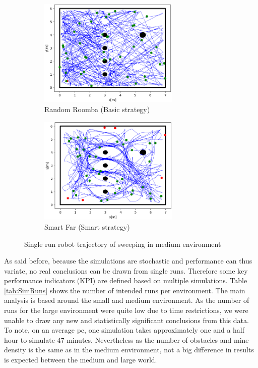 \documentclass[conference]{IEEEtran}
\begin{document}
\begin{figure}[htbp]
     \centering
     \begin{subfigure}[b]{70mm}
         \centering
         \includegraphics[width=67mm]{Traject_Medium_RandomRoomba_10-12-2020_140644_Mines.png}
         \caption{Random Roomba (Basic strategy)}
         \label{fig:RandomRoombaSingleRun}
     \end{subfigure}
     \begin{subfigure}[b]{70mm}
         \centering
         \includegraphics[width=67mm]{Traject_Medium_SmartFar_11-12-2020_215635_Mines.png}
         \caption{Smart Far (Smart strategy)}
         \label{fig:SlamXSingleRun}
     \end{subfigure}
        \caption{Single run robot trajectory of sweeping in medium environment}
        \label{fig:SingleRunTraject}
\end{figure}

As said before, because the simulations are stochastic and performance can thus variate, no real conclusions can be drawn from single runs. Therefore some key performance indicators (KPI) are defined based on multiple simulations. Table \ref{tab:SimRuns} shows the number of intended runs per environment. The main analysis is based around the small and medium environment. As the number of runs for the large environment were quite low due to time restrictions, we were unable to draw any new and statistically significant conclusions from this data. To note, on an average pc, one simulation takes approximately one and a half hour to simulate 47 minutes. Nevertheless as the number of obstacles and mine density is the same as in the medium environment, not a big difference in results is expected between the medium and large world. \\
\end{document}
